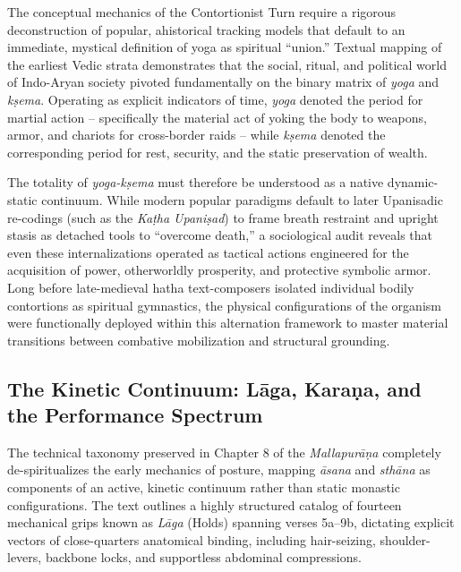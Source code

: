\documentclass[11pt,twoside,letterpaper]{article}
\begin{document}
The conceptual mechanics of the Contortionist Turn require a rigorous deconstruction of popular, ahistorical tracking models that default to an immediate, mystical definition of yoga as spiritual ``union.'' Textual mapping of the earliest Vedic strata demonstrates that the social, ritual, and political world of Indo-Aryan society pivoted fundamentally on the binary matrix of \textit{yoga} and \textit{kṣema}. Operating as explicit indicators of time, \textit{yoga} denoted the period for martial action -- specifically the material act of yoking the body to weapons, armor, and chariots for cross-border raids -- while \textit{kṣema} denoted the corresponding period for rest, security, and the static preservation of wealth. 

The totality of \textit{yoga-kṣema} must therefore be understood as a native dynamic-static continuum. While modern popular paradigms default to later Upanisadic re-codings (such as the \textit{Kaṭha Upaniṣad}) to frame breath restraint and upright stasis as detached tools to ``overcome death,'' a sociological audit reveals that even these internalizations operated as tactical actions engineered for the acquisition of power, otherworldly prosperity, and protective symbolic armor. Long before late-medieval hatha text-composers isolated individual bodily contortions as spiritual gymnastics, the physical configurations of the organism were functionally deployed within this alternation framework to master material transitions between combative mobilization and structural grounding.

\subsection{The Kinetic Continuum: Lāga, Karaṇa, and the Performance Spectrum}

The technical taxonomy preserved in Chapter 8 of the \textit{Mallapurāṇa} completely de-spiritualizes the early mechanics of posture, mapping \textit{āsana} and \textit{sthāna} as components of an active, kinetic continuum rather than static monastic configurations. The text outlines a highly structured catalog of fourteen mechanical grips known as \textit{Lāga} (Holds) spanning verses 5a--9b, dictating explicit vectors of close-quarters anatomical binding, including hair-seizing, shoulder-levers, backbone locks, and supportless abdominal compressions. 
\end{document}
